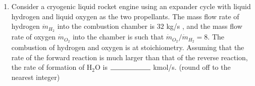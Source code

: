 \documentclass[journal,12pt,onecolumn]{IEEEtran}
\theoremstyle{remark}
\begin{document}
\begin{enumerate}[start=53]
	\item Consider a cryogenic liquid rocket engine using an expander cycle with liquid hydrogen and liquid oxygen as the two propellants. The mass flow rate of hydrogen $\dot{m}_{H_2}$ into the combustion chamber is $32$ kg/s , and the mass flow rate of oxygen $\dot{m}_{O_2}$ into the chamber is such that $\dot{m}_{O_2}/\dot{m}_{H_2}=8$. The combustion of hydrogen and oxygen is at stoichiometry. Assuming that the rate of the forward reaction is much larger than that of the reverse reaction, the rate of formation of $\text{H}_2$O is $\rule{2cm}{0.4pt}$ kmol/s. (round off to the nearest integer)


\end{enumerate}
\end{document}
